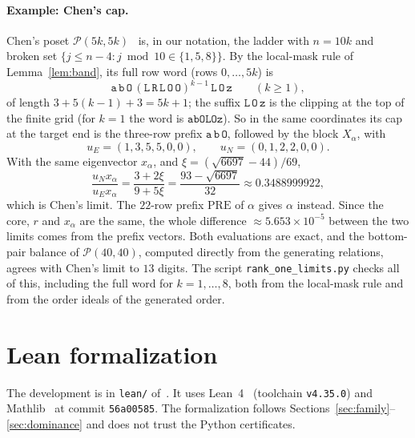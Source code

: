 \documentclass[11pt]{amsart}
\theoremstyle{definition}
\theoremstyle{remark}
\newcommand{\mk}[1]{\mathtt{#1}}
\begin{document}
\paragraph{Example: Chen's cap.} Chen's poset $\mathcal P(5k,5k)$~\cite[Definitions~7--8]{Chen18} is, in our notation, the ladder with $n=10k$ and broken set $\{j\le n-4: j\bmod10\in\{1,5,8\}\}$. By the local-mask rule of Lemma~\ref{lem:band}, its full row word (rows $0,\dots,5k$) is
\[
\mk{a}\,\mk{b}\,\mk{O}\,(\mk{L}\,\mk{R}\,\mk{L}\,\mk{O}\,\mk{O})^{k-1}\,\mk{L}\,\mk{O}\,\mk{z}\qquad(k\ge1),
\]
of length $3+5(k-1)+3=5k+1$; the suffix $\mk{L}\,\mk{O}\,\mk{z}$ is the clipping at the top of the finite grid (for $k=1$ the word is $\mk{a}\mk{b}\mk{O}\mk{L}\mk{O}\mk{z}$). So in the same coordinates its cap at the target end is the three-row prefix $\mk{a}\,\mk{b}\,\mk{O}$, followed by the block $X_\alpha$, with
\[
u_E=(1,3,5,5,0,0),\qquad u_N=(0,1,2,2,0,0).
\]
With the same eigenvector $x_\alpha$, and $\xi=(\sqrt{6697}-44)/69$,
\[
\frac{u_Nx_\alpha}{u_Ex_\alpha}=\frac{3+2\xi}{9+5\xi}=\frac{93-\sqrt{6697}}{32}\approx0.3488999922,
\]
which is Chen's limit. The $22$-row prefix $\mathrm{PRE}$ of $\alpha$ gives $\alpha$ instead. Since the core, $r$ and $x_\alpha$ are the same, the whole difference $\approx5.653\times10^{-5}$ between the two limits comes from the prefix vectors. Both evaluations are exact, and the bottom-pair balance of $\mathcal P(40,40)$, computed directly from the generating relations, agrees with Chen's limit to $13$ digits. The script \texttt{rank\_one\_limits.py} checks all of this, including the full word for $k=1,\dots,8$, both from the local-mask rule and from the order ideals of the generated order.

\section{Lean formalization}\label{sec:lean}

The development is in \texttt{lean/} of~\cite{repo}. It uses Lean~4~\cite{Lean4} (toolchain \texttt{v4.35.0}) and Mathlib~\cite{Mathlib20} at commit \texttt{56a00585}. The formalization follows Sections~\ref{sec:family}--\ref{sec:dominance} and does not trust the Python certificates.
\end{document}
